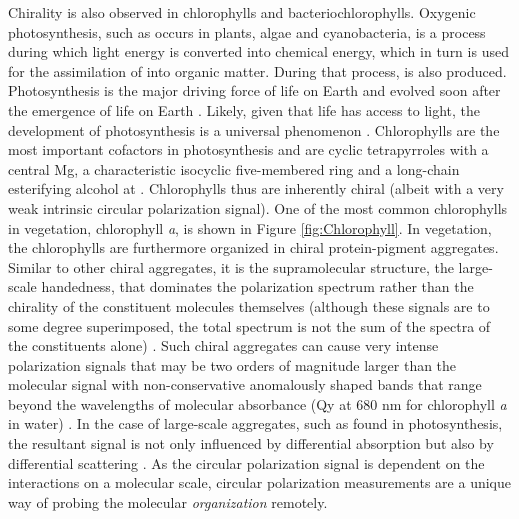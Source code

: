 \documentclass[review]{elsarticle}
\begin{document}
Chirality is also observed in chlorophylls and bacteriochlorophylls. Oxygenic photosynthesis, such as occurs in plants, algae and cyanobacteria, is a process during which light energy is converted into chemical energy, which in turn is used for the assimilation of  into organic matter. During that process,  is also produced. Photosynthesis is the major driving force of life on Earth and evolved soon after the emergence of life on Earth \cite{Hohmann-Marriott2011,Blankenship2010,Xiong2002}. Likely, given that life has access to light, the development of photosynthesis is a universal phenomenon \cite{Wolstencroft2002,Rothschild2008}. Chlorophylls are the most important cofactors in photosynthesis and are cyclic tetrapyrroles with a central Mg, a characteristic isocyclic five-membered ring and a long-chain esterifying alcohol at  \cite{Scheer2006}. Chlorophylls thus are inherently chiral (albeit with a very weak intrinsic circular polarization signal). One of the most common chlorophylls in vegetation, chlorophyll \textit{a}, is shown in Figure \ref{fig:Chlorophyll}. In vegetation, the chlorophylls are furthermore organized in chiral protein-pigment aggregates. Similar to other chiral aggregates, it is the supramolecular structure, the large-scale handedness, that dominates the polarization spectrum rather than the chirality of the constituent molecules themselves (although these signals are to some degree superimposed, the total spectrum is not the sum of the spectra of the constituents alone) \cite{Keller1986, Barzda1994}. Such chiral aggregates can cause very intense polarization signals that may be two orders of magnitude larger than the molecular signal with non-conservative anomalously shaped bands that range beyond the wavelengths of molecular absorbance (Qy at 680 nm for chlorophyll \textit{a} in water) \cite{Garab2009}. In the case of large-scale aggregates, such as found in photosynthesis, the resultant signal is not only influenced by differential absorption but also by differential scattering \cite{Bustamante1983}. As the circular polarization signal is dependent on the interactions on a molecular scale, circular polarization measurements are a unique way of probing the molecular \textit{organization} remotely.
\end{document}
